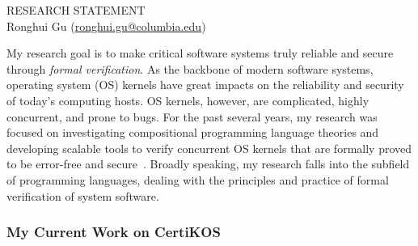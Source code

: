 \documentclass[a4paper, 10pt]{article}
\newcommand*{\email}[1]{\normalsize\href{mailto:#1}{#1}}
\begin{document}
\begin{small}

\begin{center}
{RESEARCH STATEMENT}\\
\vspace*{0.2cm}
{\normalsize Ronghui Gu (\email{ronghui.gu@columbia.edu})}
\end{center}



My research goal is to make critical software systems truly reliable and secure through \emph{formal verification}.
As the backbone of 
modern software systems,
operating system (OS) kernels
  have great impacts on the reliability and security of today's computing hosts. OS kernels, however, are complicated, highly concurrent, and prone to bugs.  For the past several years,  my research was focused on investigating compositional programming language theories and developing scalable tools to verify concurrent OS kernels that are formally proved to be error-free and secure~\cite{popl15-gu, osdi16-gu, pldi16-security, pldi16-device, cav17-yuan, oopsla17-zhai, aplas17-kim, jar-device, pldi18-gu, cacm-gu}.
Broadly speaking, my research
falls into 
the subfield of programming languages,
dealing with the principles and practice of  formal verification
of  system software.



\subsubsection*{\large My Current Work on CertiKOS}


\end{small}
\end{document}

